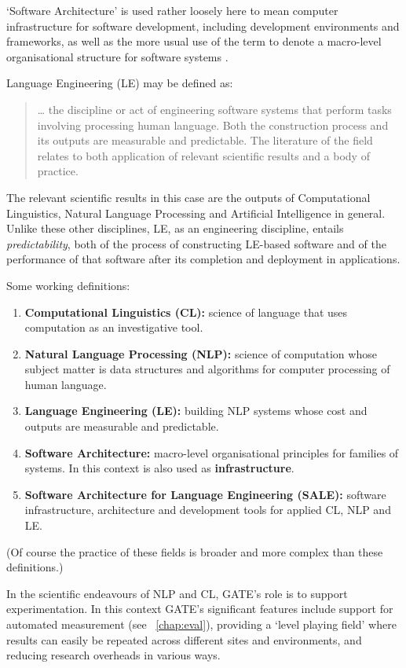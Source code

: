 `Software Architecture' is used rather loosely here to mean
computer infrastructure for software development, including development
environments and frameworks, as well as the more usual use of the term to denote
a macro-level organisational structure for software systems \cite{Sha96a}.

Language Engineering (LE) may be defined as:
\begin{quote}
\ldots
the discipline or act of engineering software systems that perform tasks
involving processing human language. Both the construction process and its
outputs are measurable and predictable. The literature of the field relates
to both application of relevant scientific results and a body of
practice. \cite{Cun99b}
\end{quote}
The relevant scientific results in this case are the outputs of
Computational Linguistics, Natural Language Processing and Artificial
Intelligence in general. Unlike these other disciplines, LE, as an
engineering discipline, entails {\em predictability}, both of the process of
constructing LE-based software and of the performance of that software after
its completion and deployment in applications.

Some working definitions:

\begin{enumerate}
\item {\bf Computational Linguistics (CL):} science of language that uses
computation as an investigative tool.
\item
{\bf Natural Language Processing (NLP):} science of computation whose subject
matter is data structures and algorithms for computer processing of
human language.
\item
{\bf Language Engineering (LE):} building NLP systems whose cost and outputs
are measurable and predictable.
\item
{\bf Software Architecture:} macro-level organisational principles for
families of systems. In this context is also used as {\bf infrastructure}.
\item
{\bf Software Architecture for Language Engineering (SALE):}
software infrastructure, architecture and development tools for applied
CL, NLP and LE.
\end{enumerate}
%
(Of course the practice of these fields is broader and more complex than these
definitions.)

In the scientific endeavours of NLP and CL, GATE's role is to support
experimentation. In this context GATE's significant features include support
for automated measurement (see \Chapthing\ \ref{chap:eval}), providing a
`level playing field' where results can easily be repeated across different
sites and environments, and reducing research overheads in various ways.


